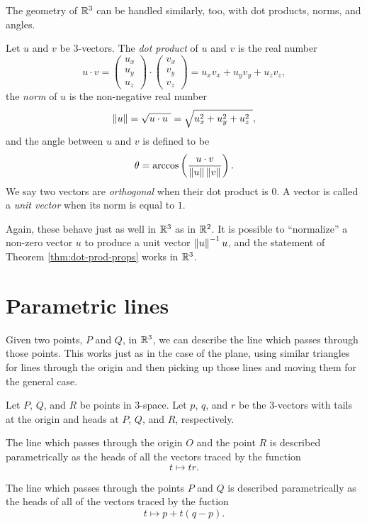 \documentclass[00-livre-main.tex]{subfiles}
\begin{document}
The geometry of $\mathbb{R}^3$ can be handled similarly, too, with dot products, norms, and angles. 

\begin{definition}
Let $u$ and $v$ be $3$-vectors. The \emph{dot product} of $u$ and $v$ is the real number
\[
u \cdot v = \begin{pmatrix} u_x \\ u_y \\ u_z \end{pmatrix} \cdot \begin{pmatrix} v_x \\ v_y \\ v_z \end{pmatrix} = u_x v_x + u_y v_y + u_z v_z,
\]
the \emph{norm} of $u$ is the non-negative real number
\[
\left\|u\right\| = \sqrt{u\cdot u\ } = \sqrt{ u_x^2 + u_y^2 + u_z^2\ }, 
\]
and the angle between $u$ and $v$ is defined to be 
\[
\theta = \arccos\left( \dfrac{u\cdot v}{\left\|u\right\|\left\|v\right\|} \right). 
\]
We say two vectors are \emph{orthogonal} when their dot product is $0$. A vector is called a \emph{unit vector} when its norm is equal to $1$.
\end{definition}

Again, these behave just as well in $\mathbb{R}^3$ as in $\mathbb{R}^2$. It is possible to ``normalize'' a non-zero vector $u$ to produce a unit vector $\left\|u\right\|^{-1} u$, and the statement of Theorem \ref{thm:dot-prod-props} works in $\mathbb{R}^3$.


\section*{Parametric lines}

Given two points, $P$ and $Q$, in $\mathbb{R}^3$, we can describe the line which passes through those points. This works just as in the case of the plane, using similar triangles for lines through the origin and then picking up those lines and moving them for the general case.

\begin{theorem} Let $P$, $Q$, and $R$ be points in $3$-space. Let $p$, $q$, and $r$ be the $3$-vectors with tails at the origin and heads at $P$, $Q$, and $R$, respectively. 
\begin{compactitem}
\item The line which passes through the origin $O$ and the point $R$ is described parametrically as the heads of all the vectors traced by the function
\[
t \mapsto t r.
\]
\item The line which passes through the points $P$ and $Q$ is described parametrically as the heads of all of the vectors traced by the fuction 
\[
t \mapsto p + t (q-p).
\]
\end{compactitem}
\end{theorem}
\end{document}
